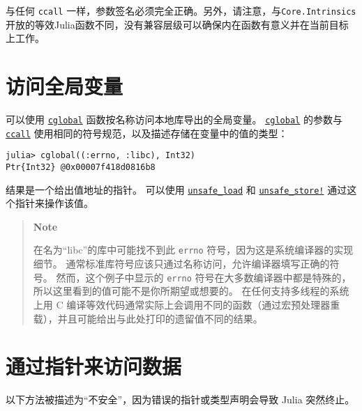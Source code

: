 与任何 \texttt{ccall} 一样，参数签名必须完全正确。另外，请注意，与\texttt{Core.Intrinsics}开放的等效Julia函数不同，没有兼容层级可以确保内在函数有意义并在当前目标上工作。



\hypertarget{6755654760318927882}{}


\section{访问全局变量}



可以使用 \hyperlink{2746947069730856184}{\texttt{cglobal}} 函数按名称访问本地库导出的全局变量。 \hyperlink{2746947069730856184}{\texttt{cglobal}} 的参数与 \hyperlink{14245046751182637566}{\texttt{ccall}} 使用相同的符号规范，以及描述存储在变量中的值的类型：




\begin{verbatim}
julia> cglobal((:errno, :libc), Int32)
Ptr{Int32} @0x00007f418d0816b8
\end{verbatim}



结果是一个给出值地址的指针。 可以使用 \hyperlink{13744149973765810952}{\texttt{unsafe\_load}} 和 \hyperlink{4579672834750013041}{\texttt{unsafe\_store!}} 通过这个指针来操作该值。



\begin{quote}
\textbf{Note}

在名为“libc”的库中可能找不到此 \texttt{errno} 符号，因为这是系统编译器的实现细节。 通常标准库符号应该只通过名称访问，允许编译器填写正确的符号。 然而，这个例子中显示的 \texttt{errno} 符号在大多数编译器中都是特殊的，所以这里看到的值可能不是你所期望或想要的。 在任何支持多线程的系统上用 C 编译等效代码通常实际上会调用不同的函数（通过宏预处理器重载），并且可能给出与此处打印的遗留值不同的结果。

\end{quote}


\hypertarget{5779343654335654313}{}


\section{通过指针来访问数据}



以下方法被描述为“不安全”，因为错误的指针或类型声明会导致 Julia 突然终止。



